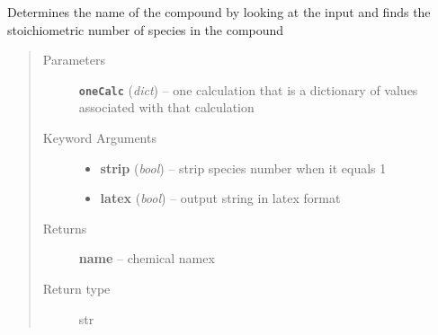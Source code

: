\documentclass[letterpaper,10pt,english]{sphinxmanual}
\begin{document}
\begin{fulllineitems}
\label{retr:retr.__getStoicName}
Determines the name of the compound by looking at the input and
finds the stoichiometric number of species in the compound
\begin{quote}\begin{description}
\item[{Parameters}] \leavevmode
\textbf{\texttt{oneCalc}} (\emph{dict}) -- one calculation that is a dictionary of values associated with that calculation

\item[{Keyword Arguments}] \leavevmode\begin{itemize}
\item {} 
\textbf{strip} (\emph{bool}) --
strip species number when it equals 1

\item {} 
\textbf{latex} (\emph{bool}) --
output string in latex format

\end{itemize}

\item[{Returns}] \leavevmode
\textbf{name} --
chemical namex

\item[{Return type}] \leavevmode
str

\end{description}\end{quote}

\end{fulllineitems}

\end{document}
